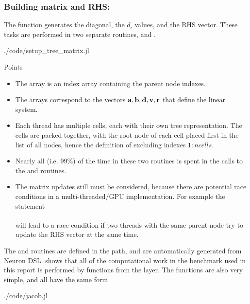 \subsubsection{Building matrix and RHS: }
The function  generates the diagonal, the $d_i$ values, and the RHS vector. These tasks are performed in two separate routines,  and .
\begin{shaded}
 {./code/setup_tree_matrix.jl}
\end{shaded}

Points
\begin{itemize}
\item
    The array  is an index array containing the parent node indexes.
\item
    The arrays  correspond to the vectors $\mathbf{a}, \mathbf{b}, \mathbf{d}, \mathbf{v}, \mathbf{r}$ that define the linear system.
\item
    Each thread has multiple cells, each with their own tree representation. The cells are packed together, with the root node of each cell placed first in the list of all nodes, hence the definition of  excluding indexes $1:ncells$.
\item
    Nearly all (i.e. 99\%) of the time in these two routines is spent in the calls to the  and  routines.
\item
    The matrix updates still must be considered, because there are potential race conditions in a multi-threaded/GPU implementation. For example the statement \\  \\ will lead to a race condition if two threads with the same parent node try to update the RHS vector at the same time.
\end{itemize}

The  and  routines are defined in the  path, and are automatically generated from Neuron \hoc DSL.  shows that all of the computational work in the \neuron benchmark used in this report is performed by functions from the \hoc layer. The  functions are also very simple, and all have the same form 
\begin{shaded}
 {./code/jacob.jl}
\end{shaded}

